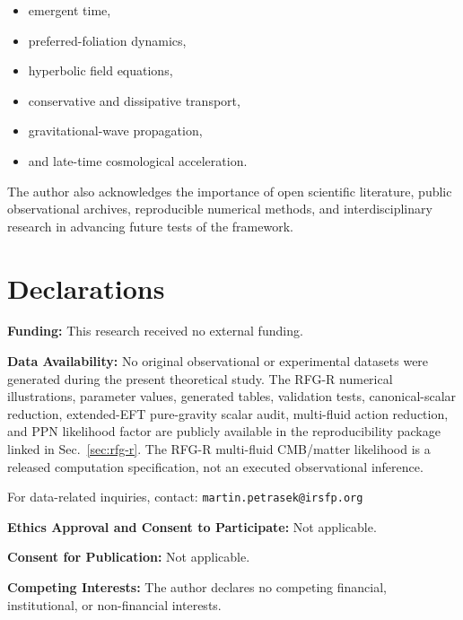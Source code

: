 \documentclass[11pt,a4paper]{article}
\begin{document}
\begin{itemize}
    \item emergent time,
    \item preferred-foliation dynamics,
    \item hyperbolic field equations,
    \item conservative and dissipative transport,
    \item gravitational-wave propagation,
    \item and late-time cosmological acceleration.
\end{itemize}

The author also acknowledges the importance of open scientific literature,
public observational archives, reproducible numerical methods, and
interdisciplinary research in advancing future tests of the framework.

\section*{Declarations}

\noindent
\textbf{Funding:}
This research received no external funding.

\medskip

\noindent
\textbf{Data Availability:}
No original observational or experimental datasets were generated during the
present theoretical study. The RFG-R numerical illustrations, parameter values,
generated tables, validation tests, canonical-scalar reduction, extended-EFT pure-gravity scalar audit, multi-fluid action reduction, and PPN likelihood factor are publicly
available in the reproducibility package linked in Sec.~\ref{sec:rfg-r}.
The RFG-R multi-fluid CMB/matter likelihood is a released computation
specification, not an executed observational inference.

\medskip

\noindent
For data-related inquiries, contact:
\texttt{martin.petrasek@irsfp.org}

\medskip

\noindent
\textbf{Ethics Approval and Consent to Participate:}
Not applicable.

\medskip

\noindent
\textbf{Consent for Publication:}
Not applicable.

\medskip

\noindent
\textbf{Competing Interests:}
The author declares no competing financial, institutional, or non-financial interests.

\medskip
\end{document}
